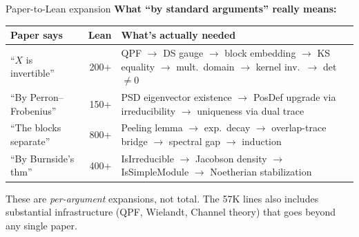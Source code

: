 \documentclass[aspectratio=169,10pt]{beamer}
\begin{document}
\begin{frame}{Paper-to-Lean expansion}
    \vspace{-0.2em}
    \textcolor{leangreen}{\textbf{What ``by standard arguments'' really means:}}
    \vspace{0.3em}
    \begin{center}
    \renewcommand{\arraystretch}{1.2}
    {\footnotesize
    \begin{tabular}{@{}p{3.5cm} r p{7.5cm}@{}}
        \toprule
        \textbf{Paper says} & \textbf{Lean} & \textbf{What's actually needed} \\
        \midrule
        ``$X$ is invertible'' & 200+ & QPF $\to$ DS gauge $\to$ block embedding $\to$ KS equality $\to$ mult.\ domain $\to$ kernel inv.\ $\to$ det $\neq 0$ \\
        ``By Perron--Frobenius'' & 150+ & PSD eigenvector existence $\to$ PosDef upgrade via irreducibility $\to$ uniqueness via dual trace \\
        ``The blocks separate'' & 800+ & Peeling lemma $\to$ exp.\ decay $\to$ overlap-trace bridge $\to$ spectral gap $\to$ induction \\
        ``By Burnside's thm'' & 400+ & IsIrreducible $\to$ Jacobson density $\to$ IsSimpleModule $\to$ Noetherian stabilization \\
        \bottomrule
    \end{tabular}
    }
    \end{center}
    \vspace{0.4em}
    \textcolor{dimwhite}{\footnotesize These are \emph{per-argument} expansions, not total. The 57K lines also includes substantial infrastructure (QPF, Wielandt, Channel theory) that goes beyond any single paper.}
\end{frame}
\end{document}
